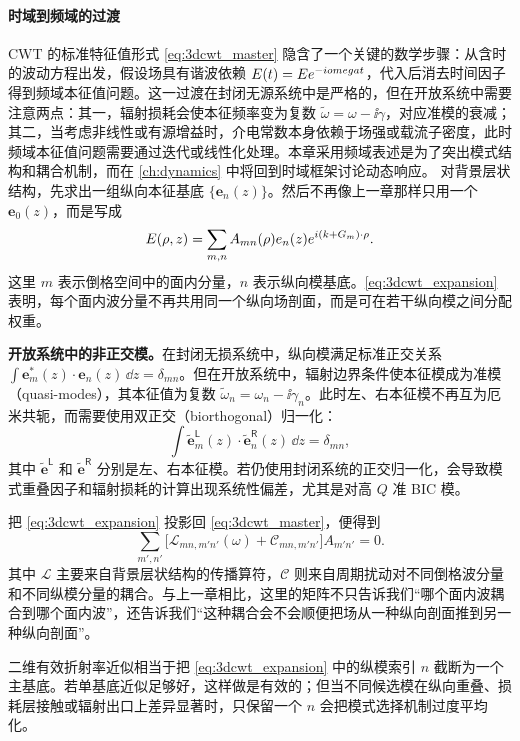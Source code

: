 \paragraph{时域到频域的过渡}
CWT 的标准特征值形式 \cref{eq:3dcwt_master} 隐含了一个关键的数学步骤：从含时的波动方程出发，假设场具有谐波依赖 $E(t) = Ee^{-iomega t}$，代入后消去时间因子得到频域本征值问题。这一过渡在封闭无源系统中是严格的，但在开放系统中需要注意两点：其一，辐射损耗会使本征频率变为复数 $\tilde{\omega} = \omega - \ii\gamma$，对应准模的衰减；其二，当考虑非线性或有源增益时，介电常数本身依赖于场强或载流子密度，此时频域本征值问题需要通过迭代或线性化处理。本章采用频域表述是为了突出模式结构和耦合机制，而在 \cref{ch:dynamics} 中将回到时域框架讨论动态响应。
对背景层状结构，先求出一组纵向本征基底 $\{\bm{e}_n(z)\}$。然后不再像上一章那样只用一个 $\bm{e}_0(z)$，而是写成
\begin{equation}
E(\rho,z)
=
\sum_{m,n}
A_{mn}(\rho)
e_n(z)
e^{i(k+G_m)\cdot\rho}.
\label{eq:3dcwt_expansion}
\end{equation}
这里 $m$ 表示倒格空间中的面内分量，$n$ 表示纵向模基底。\cref{eq:3dcwt_expansion} 表明，每个面内波分量不再共用同一个纵向场剖面，而是可在若干纵向模之间分配权重。
\begin{notebox}
\textbf{开放系统中的非正交模。}在封闭无损系统中，纵向模满足标准正交关系 $\int \bm{e}_m^\ast(z)\cdot\bm{e}_n(z)\,\dd z = \delta_{mn}$。但在开放系统中，辐射边界条件使本征模成为准模（quasi-modes），其本征值为复数 $\tilde{\omega}_n = \omega_n - \ii\gamma_n$。此时左、右本征模不再互为厄米共轭，而需要使用双正交（biorthogonal）归一化：
\[
\int \tilde{\bm{e}}_m^{\mathsf L}(z)\cdot\tilde{\bm{e}}_n^{\mathsf R}(z)\,\dd z = \delta_{mn},
\]
其中 $\tilde{\bm{e}}^{\mathsf L}$ 和 $\tilde{\bm{e}}^{\mathsf R}$ 分别是左、右本征模。若仍使用封闭系统的正交归一化，会导致模式重叠因子和辐射损耗的计算出现系统性偏差，尤其是对高 $Q$ 准 BIC 模。
\end{notebox}
把 \cref{eq:3dcwt_expansion} 投影回 \cref{eq:3dcwt_master}，便得到
\begin{equation}
\sum_{m',n'}
\Big[
\mathcal{L}_{mn,m'n'}(\omega)
+
\mathcal{C}_{mn,m'n'}
\Big]A_{m'n'}
=0.
\label{eq:3dcwt_matrix}
\end{equation}
其中 $\mathcal{L}$ 主要来自背景层状结构的传播算符，$\mathcal{C}$ 则来自周期扰动对不同倒格波分量和不同纵模分量的耦合。与上一章相比，这里的矩阵不只告诉我们“哪个面内波耦合到哪个面内波”，还告诉我们“这种耦合会不会顺便把场从一种纵向剖面推到另一种纵向剖面”。

二维有效折射率近似相当于把 \cref{eq:3dcwt_expansion} 中的纵模索引 $n$ 截断为一个主基底。若单基底近似足够好，这样做是有效的；但当不同候选模在纵向重叠、损耗层接触或辐射出口上差异显著时，只保留一个 $n$ 会把模式选择机制过度平均化。


